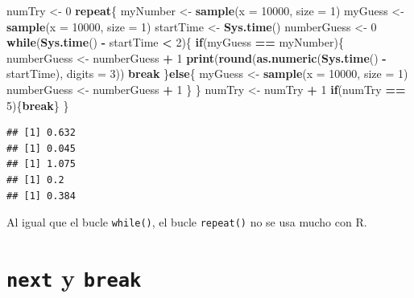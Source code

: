\documentclass[
]{book}
\newenvironment{Shaded}{\begin{snugshade}}{\end{snugshade}}
\newcommand{\ControlFlowTok}[1]{\textcolor[rgb]{0.13,0.29,0.53}{\textbf{#1}}}
\newcommand{\DataTypeTok}[1]{\textcolor[rgb]{0.13,0.29,0.53}{#1}}
\newcommand{\DecValTok}[1]{\textcolor[rgb]{0.00,0.00,0.81}{#1}}
\newcommand{\KeywordTok}[1]{\textcolor[rgb]{0.13,0.29,0.53}{\textbf{#1}}}
\newcommand{\NormalTok}[1]{#1}
\newcommand{\OperatorTok}[1]{\textcolor[rgb]{0.81,0.36,0.00}{\textbf{#1}}}
\newcommand{\StringTok}[1]{\textcolor[rgb]{0.31,0.60,0.02}{#1}}
\begin{document}
\begin{Shaded}
\begin{Highlighting}[]
\NormalTok{numTry <-}\StringTok{ }\DecValTok{0}
\ControlFlowTok{repeat}\NormalTok{\{}
\NormalTok{  myNumber <-}\StringTok{ }\KeywordTok{sample}\NormalTok{(}\DataTypeTok{x =} \DecValTok{10000}\NormalTok{, }\DataTypeTok{size =} \DecValTok{1}\NormalTok{)}
\NormalTok{  myGuess <-}\StringTok{ }\KeywordTok{sample}\NormalTok{(}\DataTypeTok{x =} \DecValTok{10000}\NormalTok{, }\DataTypeTok{size =} \DecValTok{1}\NormalTok{)}
\NormalTok{  startTime <-}\StringTok{ }\KeywordTok{Sys.time}\NormalTok{()}
\NormalTok{  numberGuess <-}\StringTok{ }\DecValTok{0}
  \ControlFlowTok{while}\NormalTok{(}\KeywordTok{Sys.time}\NormalTok{() }\OperatorTok{-}\StringTok{ }\NormalTok{startTime }\OperatorTok{<}\StringTok{ }\DecValTok{2}\NormalTok{)\{}
    \ControlFlowTok{if}\NormalTok{(myGuess }\OperatorTok{==}\StringTok{ }\NormalTok{myNumber)\{}
\NormalTok{      numberGuess <-}\StringTok{ }\NormalTok{numberGuess }\OperatorTok{+}\StringTok{ }\DecValTok{1}
      \KeywordTok{print}\NormalTok{(}\KeywordTok{round}\NormalTok{(}\KeywordTok{as.numeric}\NormalTok{(}\KeywordTok{Sys.time}\NormalTok{() }\OperatorTok{-}\StringTok{ }\NormalTok{startTime), }\DataTypeTok{digits =} \DecValTok{3}\NormalTok{))}
      \ControlFlowTok{break}
\NormalTok{    \}}\ControlFlowTok{else}\NormalTok{\{}
\NormalTok{      myGuess <-}\StringTok{ }\KeywordTok{sample}\NormalTok{(}\DataTypeTok{x =} \DecValTok{10000}\NormalTok{, }\DataTypeTok{size =} \DecValTok{1}\NormalTok{)}
\NormalTok{      numberGuess <-}\StringTok{ }\NormalTok{numberGuess }\OperatorTok{+}\StringTok{ }\DecValTok{1}
\NormalTok{    \}}
\NormalTok{  \}}
\NormalTok{  numTry <-}\StringTok{ }\NormalTok{numTry }\OperatorTok{+}\StringTok{ }\DecValTok{1}
  \ControlFlowTok{if}\NormalTok{(numTry }\OperatorTok{==}\StringTok{ }\DecValTok{5}\NormalTok{)\{}\ControlFlowTok{break}\NormalTok{\}}
\NormalTok{\}}
\end{Highlighting}
\end{Shaded}

\begin{verbatim}
## [1] 0.632
## [1] 0.045
## [1] 1.075
## [1] 0.2
## [1] 0.384
\end{verbatim}

Al igual que el bucle \texttt{while()}, el bucle \texttt{repeat()} no se usa mucho con R.

\hypertarget{l17spe}{%
\section{\texorpdfstring{\texttt{next} y \texttt{break}}{next y break}}\label{l17spe}}
\end{document}
